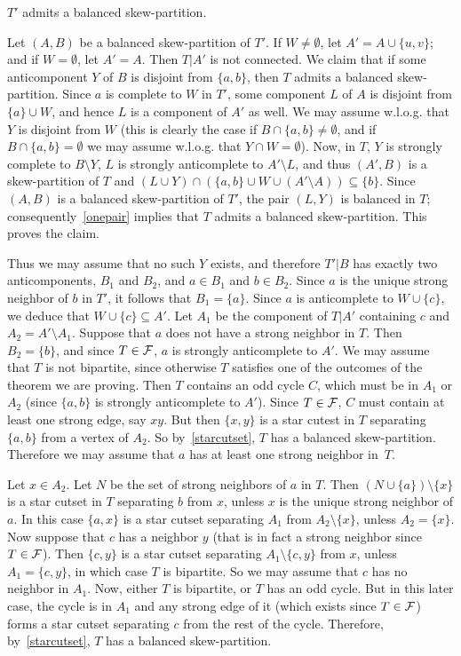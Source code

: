 \documentclass[11 pt] {article}
\newcounter{claim}
\begin{document}
 $T'$ admits a balanced skew-partition.

Let $(A,B)$ be a balanced skew-partition of $T'$. If $W \neq
\emptyset$, let $A'=A \cup \{u,v\}$; and if $W=\emptyset$, let $A'=A$.
Then $T|A'$ is not connected. We claim that if some anticomponent $Y$
of $B$ is disjoint from $\{a,b\}$, then $T$ admits a balanced skew-partition. Since $a$ is complete to $W$ in $T'$, some component $L$ of
$A$ is disjoint from $\{ a\} \cup W$, and hence $L$ is a component of
$A'$ as well.  We may assume w.l.o.g. that $Y$ is disjoint from $W$
(this is clearly the case if $B\cap \{ a,b \} \neq \emptyset$, and if
$B\cap \{ a,b \} = \emptyset$ we may assume w.l.o.g. that $Y\cap
W=\emptyset$).  Now, in $T$, $Y$ is strongly complete to $B \setminus
Y$, $L$ is strongly anticomplete to $A' \setminus L$, and thus
$(A',B)$ is a skew-partition of $T$ and $(L\cup Y) \cap (\{ a,b \}
\cup W\cup (A'\setminus A)) \subseteq \{ b \}$.  Since $(A,B)$ is a
balanced skew-partition of $T'$, the pair $(L,Y)$ is balanced in $T$;
consequently~\ref{onepair} implies that $T$ admits a balanced skew-partition. This proves the claim.

Thus we may assume that no such $Y$ exists, and therefore $T'|B$ has
exactly two anticomponents, $B_1$ and $B_2$, and $a \in B_1$ and $b
\in B_2$. Since $a$ is the unique strong neighbor of $b$ in $T'$, it
follows that $B_1=\{a\}$. Since $a$ is anticomplete to $W \cup \{c\}$,
we deduce that $W \cup \{c\} \subseteq A'$. Let $A_1$ be the component
of $T|A'$ containing $c$ and $A_2=A'\setminus A_1$. Suppose that $a$
does not have a strong neighbor in $T$.  Then $B_2=\{ b\}$, and since
$T\in {\cal F}$, $a$ is strongly anticomplete to $A'$. We may assume
that $T$ is not bipartite, since otherwise $T$ satisfies one of the
outcomes of the theorem we are proving. Then $T$ contains an odd cycle
$C$, which must be in $A_1$ or $A_2$ (since $\{ a,b\}$ is strongly
anticomplete to $A'$).  Since $T \in {\cal F}$, $C$ must contain at
least one strong edge, say $xy$. But then $\{ x,y \}$ is a star cutest
in $T$ separating $\{ a,b \}$ from a vertex of $A_2$. So
by~\ref{starcutset}, $T$ has a balanced skew-partition. Therefore we
may assume that $a$ has at least one strong neighbor in~$T$.

Let $x\in A_2$. Let $N$ be the set of strong neighbors of $a$ in
$T$. Then $(N \cup \{a\}) \setminus \{x\}$ is a star cutset in $T$
separating $b$ from $x$, unless $x$ is the unique strong neighbor of
$a$. In this case $\{a,x\}$ is a star cutset separating $A_1$ from
$A_2\setminus\{x\}$, unless $A_2=\{x\}$. Now suppose that $c$ has a
neighbor $y$ (that is in fact a strong neighbor since $T \in {\cal
  F}$). Then $\{c,y\}$ is a star cutset separating $A_1 \setminus \{c,
y\}$ from $x$, unless $A_1 = \{c, y\}$, in which case $T$ is
bipartite. So we may assume that $c$ has no neighbor in $A_1$.  Now,
either $T$ is bipartite, or $T$ has an odd cycle. But in this later
case, the cycle is in $A_1$ and any strong edge of it (which exists
since $T\in {\cal F}$) forms a star cutset separating $c$ from the
rest of the cycle.  Therefore, by~\ref{starcutset}, $T$ has a balanced
skew-partition.
\end{document}
